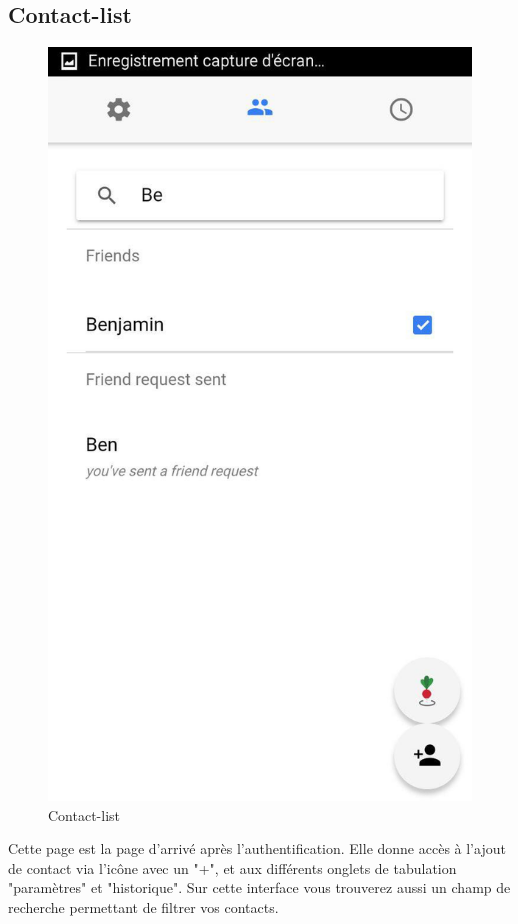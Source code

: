 \documentclass[french]{article}
\begin{document}
	\subsection{Contact-list}
	\begin{figure}[H]
		\centering
		\includegraphics[scale=0.4]{../screenshot/screenshot-contact-list2}
		\caption{Contact-list}
		\label{Contact-list}
	\end{figure} 
	Cette page est la page d'arrivé après l'authentification. Elle donne accès à l'ajout de contact via l'icône avec un "+", et aux différents onglets de tabulation "paramètres" et "historique". Sur cette interface vous trouverez aussi un champ de recherche permettant de filtrer vos contacts.
	
\end{document}
